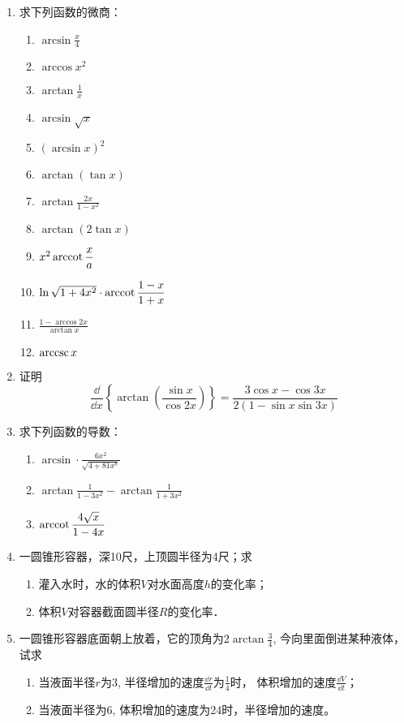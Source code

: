 \begin{ex}
\begin{enumerate}
    \item 求下列函数的微商：
\begin{multicols}{2}
\begin{enumerate}
  \item $\arcsin \frac{x}{4}$
\item  $\arccos x^{2}$
\item  $\arctan \frac{1}{x}$
\item  $\arcsin \sqrt{x}$
\item  $(\arcsin x)^{2}$
\item  $\arctan (\tan  x)$
\item $\arctan \frac{2 x}{1-x^{2}}$
\item  $\arctan (2 \tan  x)$
\item $x^{2} \arccot \frac{x}{a}$
\item $\ln \sqrt{1+4 x^{2}} \cdot \arccot \frac{1-x}{1+x}$
\item  $\frac{1-\arccos 2 x}{\arctan x}$
\item  ${\rm arccsc}\, x$
\end{enumerate}
\end{multicols}

\item 证明
   \[
    \frac{\dd}{\dd x}\left\{\arctan \left(\frac{\sin x}{\cos 2 x}\right)\right\}=\frac{3 \cos x-\cos 3 x}{2(1-\sin x \sin 3 x)}
   \]
    \item 求下列函数的导数：
\begin{enumerate}
\item $\arcsin \cdot \frac{6 x^{2}}{\sqrt{4+81 x^{8}}}$
\item $\arctan \frac{1}{1-3 x^{2}}-\arctan \frac{1}{1+3 x^{2}}$
\item $\arccot \frac{4 \sqrt{x}}{1-4 x}$
\end{enumerate}

\item 一圆锥形容器，深10尺，上顶圆半径为4尺；求
\begin{enumerate}
    \item 灌入水时，水的体积$V$对水面高度$h$的变化率；
    \item 体积$V$对容器截面圆半径$R$的变化率．
\end{enumerate}

\item 一圆锥形容器底面朝上放着，它的顶角为$2\arctan\frac{3}{4}$, 
今向里面倒进某种液体，试求
\begin{enumerate}
\item 当液面半径$r$为3, 半径增加的速度$\frac{\dd r}{\dd t}$为$\frac{1}{4}$时，
体积增加的速度$\frac{\dd V}{\dd t}$；
\item 当液面半径为6, 体积增加的速度为24时，半径增加的速度。
\end{enumerate}


\end{enumerate}
\end{ex}

